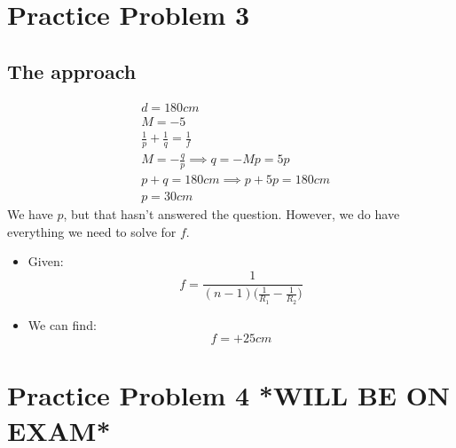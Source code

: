 \documentclass[12pt, letterpaper]{article}
\begin{document}
\section*{Practice Problem 3}

\subsection*{The approach}
\begin{align*}
    & d = 180cm \\
    & M = -5 \\
    & \frac{1}{p} + \frac{1}{q} = \frac{1}{f} \\
    & M = -\frac{q}{p} \implies q = -Mp = 5p \\
    & p + q = 180cm \implies p + 5p = 180cm \\
    & p = 30cm
\end{align*}
We have \(p\), but that hasn't answered the question. However, we do have everything we need to solve for \(f\).
\begin{itemize}
    \item Given: \[f = \frac{1}{(n-1)\Big(\frac{1}{R_{1}}-\frac{1}{R_{2}}\Big)}\]
    \item We can find: \[f = +25cm\]
\end{itemize}

\section*{Practice Problem 4 *WILL BE ON EXAM*}
\end{document}
